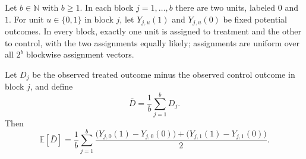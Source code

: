 \begin{theorem}
Let $b\in\mathbb{N}$ with $b\ge 1$. In each block $j=1,\ldots,b$ there are
two units, labeled $0$ and $1$. For unit $u\in\{0,1\}$ in block $j$, let
$Y_{j,u}(1)$ and $Y_{j,u}(0)$ be fixed potential outcomes. In every block,
exactly one unit is assigned to treatment and the other to control, with the
two assignments equally likely; assignments are uniform over all $2^b$
blockwise assignment vectors.

Let $D_j$ be the observed treated outcome minus the observed control outcome
in block $j$, and define
\[
\bar D=\frac{1}{b}\sum_{j=1}^b D_j.
\]
Then
\[
\mathbb E[\bar D]
=
\frac{1}{b}\sum_{j=1}^b
\frac{
  \bigl(Y_{j,0}(1)-Y_{j,0}(0)\bigr)
  +
  \bigl(Y_{j,1}(1)-Y_{j,1}(0)\bigr)
}{2}.
\]
\end{theorem}
